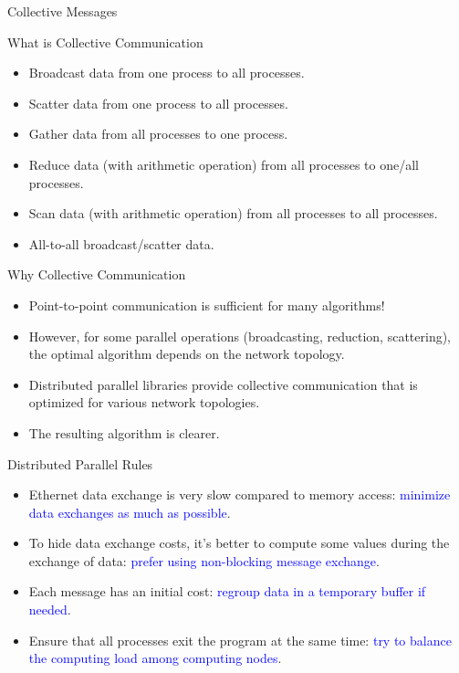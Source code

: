 \documentclass[compress,10pt,aspectratio=169]{beamer}
\begin{document}
\begin{frame}[fragile]{Collective Messages}
    \scriptsize
    \begin{exampleblock}{\scriptsize What is Collective Communication}
        \begin{itemize}
            \item Broadcast data from one process to all processes.
            \item Scatter data from one process to all processes.
            \item Gather data from all processes to one process.
            \item Reduce data (with arithmetic operation) from all processes to one/all processes.
            \item Scan data (with arithmetic operation) from all processes to all processes.
            \item All-to-all broadcast/scatter data.
        \end{itemize}
    \end{exampleblock}
    
    \begin{alertblock}{\scriptsize Why Collective Communication}
    \begin{itemize}
        \item Point-to-point communication is sufficient for many algorithms!
        \item However, for some parallel operations (broadcasting, reduction, scattering), the optimal algorithm depends on the network topology.
        \item Distributed parallel libraries provide collective communication that is optimized for various network topologies.
        \item The resulting algorithm is clearer.
    \end{itemize}
    \end{alertblock}
\end{frame}

\begin{frame}[fragile]{Distributed Parallel Rules}

    \begin{itemize}
        \item Ethernet data exchange is very slow compared to memory access: \textcolor{blue}{minimize data exchanges as much as possible}.
        \item To hide data exchange costs, it's better to compute some values during the exchange of data: \textcolor{blue}{prefer using non-blocking message exchange}.
        \item Each message has an initial cost: \textcolor{blue}{regroup data in a temporary buffer if needed}.
        \item Ensure that all processes exit the program at the same time: \textcolor{blue}{try to balance the computing load among computing nodes}.
    \end{itemize}
\end{frame}
\end{document}

